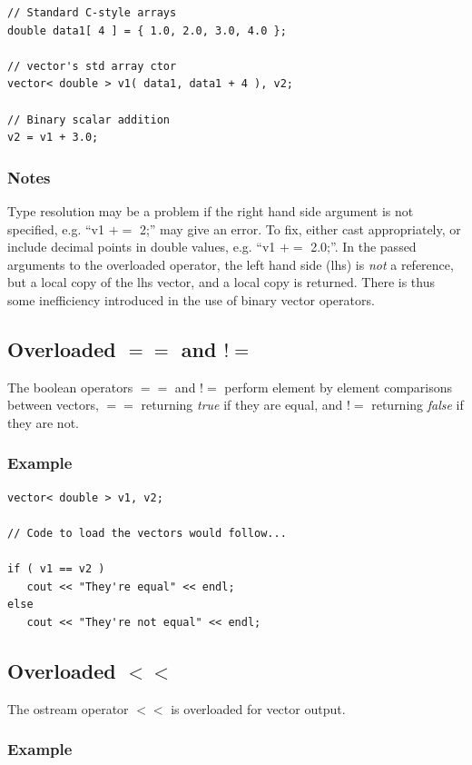 \documentclass{report}
\begin{document}
\begin{verbatim}
// Standard C-style arrays
double data1[ 4 ] = { 1.0, 2.0, 3.0, 4.0 };

// vector's std array ctor
vector< double > v1( data1, data1 + 4 ), v2;

// Binary scalar addition
v2 = v1 + 3.0;
\end{verbatim}

\subsubsection{Notes}
Type resolution may be a problem if the right hand side argument is
not specified, e.g. ``v1 $+=$ 2;'' may give an error.  To fix, either
cast appropriately, or include decimal points in double values,
e.g. ``v1 $+=$ 2.0;''.
In the passed arguments to the overloaded operator, the left hand side
(lhs) is {\em not} a reference, but a local copy of the lhs vector,
and a local copy is returned.  There is thus some inefficiency
introduced in the use of binary vector operators.

\subsection{Overloaded $==$ and $!=$}

The boolean operators $==$ and $!=$ perform element by element
comparisons between vectors, $==$ returning {\em true} if they are
equal, and $!=$ returning {\em false} if they are not.

\subsubsection{Example}

\begin{verbatim}
vector< double > v1, v2;

// Code to load the vectors would follow...

if ( v1 == v2 )
   cout << "They're equal" << endl;
else
   cout << "They're not equal" << endl;
\end{verbatim}

\subsection{Overloaded $<<$}

The ostream operator $<<$ is overloaded for vector output.

\subsubsection{Example}
\end{document}

